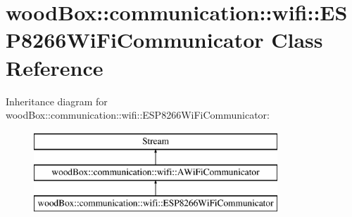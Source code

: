 \hypertarget{classwood_box_1_1communication_1_1wifi_1_1_e_s_p8266_wi_fi_communicator}{}\section{wood\+Box\+:\+:communication\+:\+:wifi\+:\+:E\+S\+P8266\+Wi\+Fi\+Communicator Class Reference}
\label{classwood_box_1_1communication_1_1wifi_1_1_e_s_p8266_wi_fi_communicator}
Inheritance diagram for wood\+Box\+:\+:communication\+:\+:wifi\+:\+:E\+S\+P8266\+Wi\+Fi\+Communicator\+:\begin{figure}[H]
\begin{center}
\leavevmode
\includegraphics[height=3.000000cm]{classwood_box_1_1communication_1_1wifi_1_1_e_s_p8266_wi_fi_communicator}
\end{center}
\end{figure}
